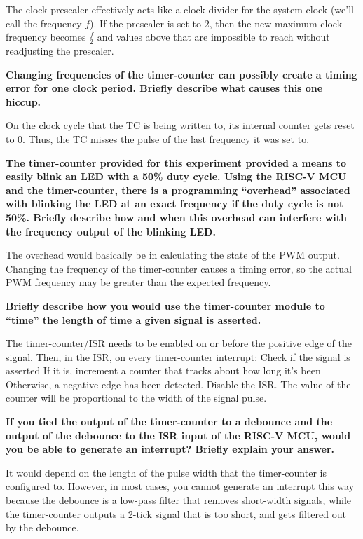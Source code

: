 \documentclass{article}
\begin{document}
\begin{outline}[enumerate]
    The clock prescaler effectively acts like a clock divider for the system clock (we'll call the frequency $f$). If the prescaler is set to 2, then the new maximum clock frequency becomes $\frac{f}{2}$ and values above that are impossible to reach without readjusting the prescaler.

    \1 \textbf{Changing frequencies of the timer-counter can possibly create a timing error for one clock period. Briefly describe what causes this one hiccup. }
    
    On the clock cycle that the TC is being written to, its internal counter gets reset to 0. Thus, the TC misses the pulse of the last frequency it was set to.

    \1 \textbf{The timer-counter provided for this experiment provided a means to easily blink an LED with a 50\% duty cycle. Using the RISC-V MCU and the timer-counter, there is a programming ``overhead'' associated with blinking the LED at an exact frequency if the duty cycle is not 50\%. Briefly describe how and when this overhead can interfere with the frequency output of the blinking LED.}
    
    The overhead would basically be in calculating the state of the PWM output. Changing the frequency of the timer-counter causes a timing error, so the actual PWM frequency may be greater than the expected frequency.

    \1 \textbf{Briefly describe how you would use the timer-counter module to “time” the length of time a given signal is asserted.  }
    
    The timer-counter/ISR needs to be enabled on or before the positive edge of the signal. Then, in the ISR, on every timer-counter interrupt:
        \2 Check if the signal is asserted
            \3 If it is, increment a counter that tracks about how long it's been
            \3 Otherwise, a negative edge has been detected. Disable the ISR.
    The value of the counter will be proportional to the width of the signal pulse.
    
    \1 \textbf{If you tied the output of the timer-counter to a debounce and the output of the debounce to the ISR input of the RISC-V MCU, would you be able to generate an interrupt? Briefly explain your answer. }

    It would depend on the length of the pulse width that the timer-counter is configured to. However, in most cases, you cannot generate an interrupt this way because the debounce is a low-pass filter that removes short-width signals, while the timer-counter outputs a 2-tick signal that is too short, and gets filtered out by the debounce.

\end{outline}
\end{document}
